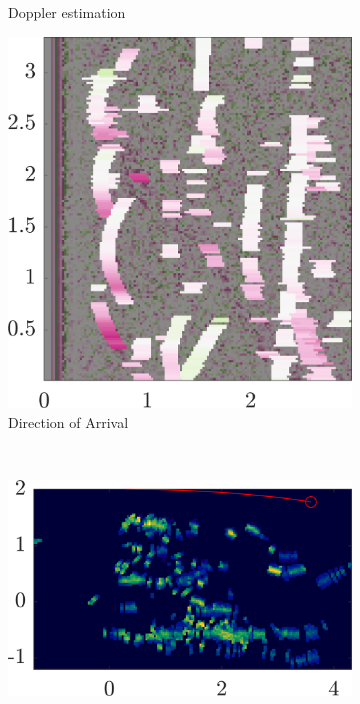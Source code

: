 \begin{figure}[htbp]
\begin{subfigure}[t]{0.32\linewidth}
        \caption{\small Doppler estimation}
    \end{subfigure}%
    \hfill%
    \begin{subfigure}[t]{0.32\linewidth}   
        \centering 
        \includegraphics[width=\linewidth]{gfx/results/basement_doa.png}
        \caption{\small Direction of Arrival}
    \end{subfigure}\\
    \begin{subfigure}[b]{0.475\textwidth}   
        \centering 
        \includegraphics[max width=\linewidth, max height=\linewidth]{gfx/results/basement_reprojection.png}

\end{subfigure}
\end{figure}
